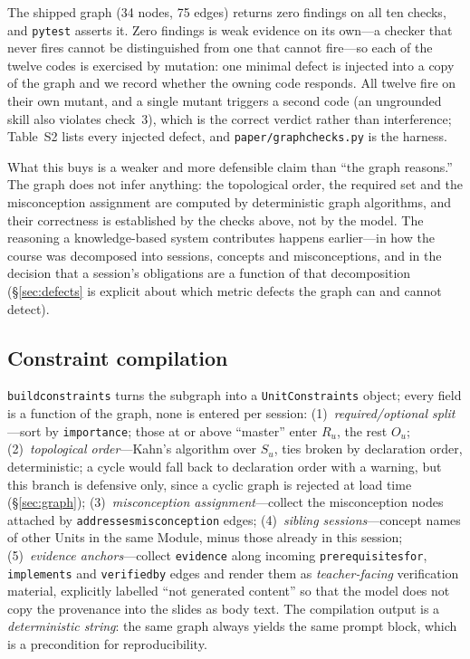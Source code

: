 \documentclass[review,12pt]{elsarticle}
\renewcommand{\_}{\kgunderscore\allowbreak}
\newcommand{\id}[1]{\texttt{#1}}
\begin{document}
The shipped graph (34 nodes, 75 edges) returns zero findings on all ten checks,
and \id{pytest} asserts it. Zero findings is weak evidence on its own---a checker
that never fires cannot be distinguished from one that cannot fire---so each of
the twelve codes is exercised by mutation: one minimal defect is injected into a
copy of the graph and we record whether the owning code responds. All twelve fire
on their own mutant, and a single mutant triggers a second code (an ungrounded
skill also violates check~3), which is the correct verdict rather than
interference; Table~S2 lists every injected defect, and \id{paper/graph\_checks.py}
is the harness.

What this buys is a weaker and more defensible claim than ``the graph reasons.''
The graph does not infer anything: the topological order, the required set and the
misconception assignment are computed by deterministic graph algorithms, and their
correctness is established by the checks above, not by the model. The reasoning a
knowledge-based system contributes happens earlier---in how the course was
decomposed into sessions, concepts and misconceptions, and in the decision that a
session's obligations are a function of that decomposition
(\S\ref{sec:defects} is explicit about which metric defects the graph can and
cannot detect).

\subsection{Constraint compilation}

\id{build\_constraints} turns the subgraph into a \id{UnitConstraints} object;
every field is a function of the graph, none is entered per session:
(1)~\emph{required/optional split}---sort by \id{importance}; those at or above
``master'' enter $R_u$, the rest $O_u$; (2)~\emph{topological order}---Kahn's
algorithm over $S_u$, ties broken by declaration order, deterministic; a cycle
would fall back to declaration order with a warning, but this branch is
defensive only, since a cyclic graph is rejected at load time
(\S\ref{sec:graph}); (3)~\emph{misconception assignment}---collect the
misconception nodes attached by \id{addresses\_misconception} edges;
(4)~\emph{sibling sessions}---concept names of other Units in the same Module,
minus those already in this session; (5)~\emph{evidence anchors}---collect
\id{evidence} along incoming \id{prerequisites\_for}, \id{implements} and
\id{verified\_by} edges and render them as \emph{teacher-facing} verification
material, explicitly labelled ``not generated content'' so that the model does
not copy the provenance into the slides as body text. The compilation output is
a \emph{deterministic string}: the same graph always yields the same prompt
block, which is a precondition for reproducibility.
\end{document}
